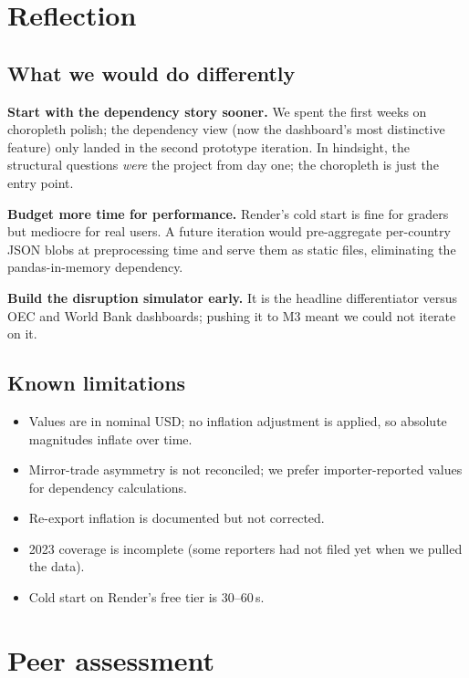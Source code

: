 \documentclass[a4paper,10pt]{article}
\begin{document}
\section{Reflection}

\subsection{What we would do differently}

\textbf{Start with the dependency story sooner.} We spent the first weeks
on choropleth polish; the dependency view (now the dashboard's most
distinctive feature) only landed in the second prototype iteration. In
hindsight, the structural questions \emph{were} the project from day
one; the choropleth is just the entry point.

\textbf{Budget more time for performance.} Render's cold start is fine
for graders but mediocre for real users. A future iteration would
pre-aggregate per-country JSON blobs at preprocessing time and serve
them as static files, eliminating the pandas-in-memory dependency.

\textbf{Build the disruption simulator early.} It is the headline
differentiator versus OEC and World Bank dashboards; pushing it to M3
meant we could not iterate on it.

\subsection{Known limitations}

\begin{itemize}
  \item Values are in nominal USD; no inflation adjustment is applied,
  so absolute magnitudes inflate over time.
  \item Mirror-trade asymmetry is not reconciled; we prefer
  importer-reported values for dependency calculations.
  \item Re-export inflation is documented but not corrected.
  \item 2023 coverage is incomplete (some reporters had not filed yet
  when we pulled the data).
  \item Cold start on Render's free tier is 30--60\,s.
\end{itemize}

\section{Peer assessment}
\end{document}
